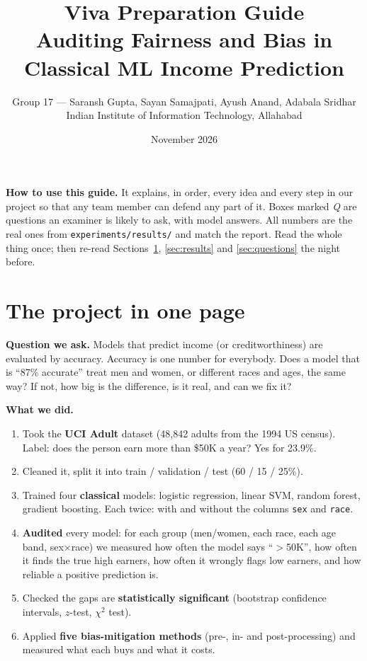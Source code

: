 \documentclass[11pt,a4paper]{article}
\title{\textbf{Viva Preparation Guide}\\[4pt]\Large Auditing Fairness and Bias in Classical ML Income Prediction}
\author{Group 17 --- Saransh Gupta, Sayan Samajpati, Ayush Anand, Adabala Sridhar\\\small Indian Institute of Information Technology, Allahabad}
\date{November 2026}
\begin{document}
\maketitle

\begin{key}
\textbf{How to use this guide.} It explains, in order, every idea and every step in our project so that any team member can defend any part of it. Boxes marked \emph{Q} are questions an examiner is likely to ask, with model answers. All numbers are the real ones from \texttt{experiments/results/} and match the report. Read the whole thing once; then re-read Sections~\ref{sec:story}, \ref{sec:results} and \ref{sec:questions} the night before.
\end{key}

\tableofcontents
\newpage

\section{The project in one page}\label{sec:story}

\textbf{Question we ask.} Models that predict income (or creditworthiness) are evaluated by accuracy. Accuracy is one number for everybody. Does a model that is ``87\% accurate'' treat men and women, or different races and ages, the same way? If not, how big is the difference, is it real, and can we fix it?

\textbf{What we did.}
\begin{enumerate}
  \item Took the \textbf{UCI Adult} dataset (48,842 adults from the 1994 US census). Label: does the person earn more than \$50K a year? Yes for 23.9\%.
  \item Cleaned it, split it into train / validation / test (60 / 15 / 25\%).
  \item Trained four \textbf{classical} models: logistic regression, linear SVM, random forest, gradient boosting. Each twice: with and without the columns \texttt{sex} and \texttt{race}.
  \item \textbf{Audited} every model: for each group (men/women, each race, each age band, sex$\times$race) we measured how often the model says ``$>$50K'', how often it finds the true high earners, how often it wrongly flags low earners, and how reliable a positive prediction is.
  \item Checked the gaps are \textbf{statistically significant} (bootstrap confidence intervals, $z$-test, $\chi^2$ test).
  \item Applied \textbf{five bias-mitigation methods} (pre-, in- and post-processing) and measured what each buys and what it costs.
\end{enumerate}
\end{document}
